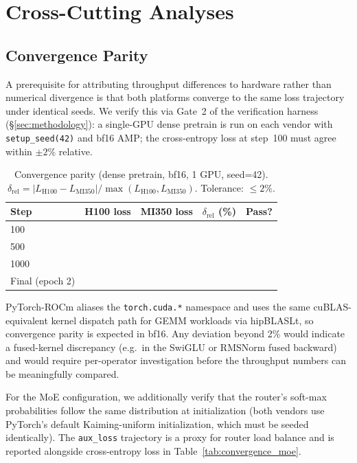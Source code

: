 \section{Cross-Cutting Analyses}
\label{sec:crosscutting}

\subsection{Convergence Parity}
\label{sec:crosscutting:convergence}

A prerequisite for attributing throughput differences to hardware rather than
numerical divergence is that both platforms converge to the same loss trajectory
under identical seeds.  We verify this via Gate~2 of the verification harness
(\S\ref{sec:methodology}): a single-GPU dense pretrain is run on each vendor
with \texttt{setup\_seed(42)} and bf16 AMP; the cross-entropy loss at step~100
must agree within $\pm 2\%$ relative.

\begin{table}[h]
\centering
\caption{Convergence parity (dense pretrain, bf16, 1 GPU, seed=42).
$\delta_{\text{rel}} = |L_{\text{H100}} - L_{\text{MI350}}| / \max(L_{\text{H100}}, L_{\text{MI350}})$.
Tolerance: $\leq 2\%$.}
\label{tab:convergence}
\small
\begin{tabular}{lrrrr}
\toprule
\textbf{Step} & \textbf{H100 loss} & \textbf{MI350 loss} & $\delta_{\text{rel}}$ (\%) & \textbf{Pass?} \\
\midrule
100  & \PH{} & \PH{} & \PH{} & \PH{} \\
500  & \PH{} & \PH{} & \PH{} & \PH{} \\
1000 & \PH{} & \PH{} & \PH{} & \PH{} \\
\midrule
Final (epoch 2) & \PH{} & \PH{} & \PH{} & \PH{} \\
\bottomrule
\end{tabular}
\end{table}

PyTorch-ROCm aliases the \texttt{torch.cuda.*} namespace and uses the same
cuBLAS-equivalent kernel dispatch path for GEMM workloads via hipBLASLt, so
convergence parity is expected in bf16.  Any deviation beyond 2\% would
indicate a fused-kernel discrepancy (e.g.\ in the SwiGLU or RMSNorm fused
backward) and would require per-operator investigation before the
throughput numbers can be meaningfully compared.

For the MoE configuration, we additionally verify that the router's soft-max
probabilities follow the same distribution at initialization (both vendors use
PyTorch's default Kaiming-uniform initialization, which must be seeded
identically).  The \texttt{aux\_loss} trajectory is a proxy for router load
balance and is reported alongside cross-entropy loss in Table~\ref{tab:convergence_moe}.

